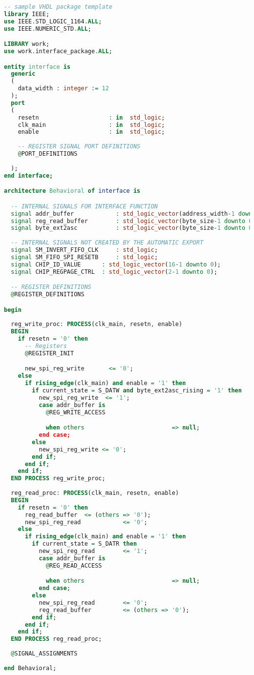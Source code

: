 \begin{lstlisting}[language=VHDL]
-- sample VHDL package template
library IEEE;
use IEEE.STD_LOGIC_1164.ALL;
use IEEE.NUMERIC_STD.ALL;

LIBRARY work;
use work.interface_package.ALL;

entity interface is
  generic
  (
    data_width : integer := 12
  );
  port
  (
    resetn                    : in  std_logic;
    clk_main                  : in  std_logic;
    enable                    : in  std_logic;
    
    -- REGISTER SIGNAL PORT DEFINITIONS      
    @PORT_DEFINITIONS
 
  );
end interface;

architecture Behavioral of interface is

  -- INTERNAL SIGNALS FOR INTERFACE FUNCTION
  signal addr_buffer            : std_logic_vector(address_width-1 downto 0);
  signal reg_read_buffer        : std_logic_vector(byte_size-1 downto 0);
  signal byte_ext2asc           : std_logic_vector(byte_size-1 downto 0);
  
  -- INTERNAL SIGNALS NOT CREATED BY THE AUTOMATIC EXPORT
  signal SM_INVERT_FIFO_CLK     : std_logic;  
  signal SM_FIFO_SPI_RESETB     : std_logic;
  signal CHIP_ID_VALUE		: std_logic_vector(16-1 downto 0);
  signal CHIP_REGPAGE_CTRL	: std_logic_vector(2-1 downto 0);

  -- REGISTER DEFINITIONS
  @REGISTER_DEFINITIONS

begin 
  
  reg_write_proc: PROCESS(clk_main, resetn, enable)
  BEGIN
    if resetn = '0' then
      -- Registers
      @REGISTER_INIT

      new_spi_reg_write       <= '0';
    else
      if rising_edge(clk_main) and enable = '1' then
        if current_state = S_DATW and byte_ext2asc_rising = '1' then
          new_spi_reg_write  <= '1';
          case addr_buffer is
            @REG_WRITE_ACCESS

            when others                         => null;
          end case;
        else
          new_spi_reg_write <= '0';
        end if;
      end if;
    end if;
  END PROCESS reg_write_proc;
  
  reg_read_proc: PROCESS(clk_main, resetn, enable)
  BEGIN
    if resetn = '0' then
      reg_read_buffer  <= (others => '0');
      new_spi_reg_read            <= '0';
    else
      if rising_edge(clk_main) and enable = '1' then
        if current_state = S_DATR then
          new_spi_reg_read        <= '1';
          case addr_buffer is
            @REG_READ_ACCESS

            when others                         => null;
          end case;
        else 
          new_spi_reg_read        <= '0';
          reg_read_buffer         <= (others => '0');
        end if;
      end if;
    end if;
  END PROCESS reg_read_proc;
  
  @SIGNAL_ASSIGNMENTS
  
end Behavioral;
\end{lstlisting}

